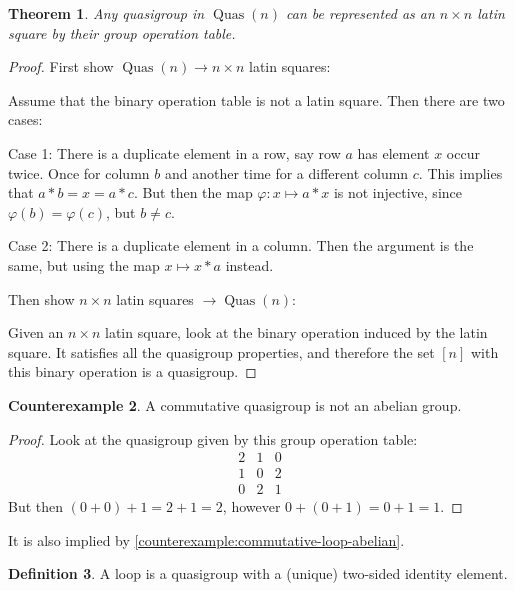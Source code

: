 \documentclass[a4paper, 12pt, english]{article}
\theoremstyle{plain}
\newtheorem{theorem}{Theorem}[section]
\theoremstyle{definition}
\newtheorem{definition}[theorem]{Definition}
\newtheorem{counterexample}[theorem]{Counterexample}
\DeclareMathOperator{\Quas}{Quas}
\begin{document}
\begin{theorem} \label{thm:latin-square-property}
    Any quasigroup in \( \Quas(n) \) can be represented as an \( n \times n \) latin square by their group operation table.
\end{theorem}
\begin{proof}
    First show \( \Quas(n) \to n \times n \) latin squares:

    Assume that the binary operation table is not a latin square. Then there are two cases:

    Case 1: There is a duplicate element in a row, say row \( a \) has element \( x \) occur twice. Once for column \( b \) and another time for a different column \( c \). This implies that \( a * b = x = a * c \). But then the map \( \varphi: x \mapsto a * x \) is not injective, since \( \varphi(b) = \varphi(c) \), but \( b \neq c \).

    Case 2: There is a duplicate element in a column. Then the argument is the same, but using the map \( x \mapsto x * a \) instead.

    Then show \( n \times n \) latin squares \( \to \Quas(n) \):

    Given an \( n \times n \) latin square, look at the binary operation induced by the latin square. It satisfies all the quasigroup properties, and therefore the set \( [n] \) with this binary operation is a quasigroup.
\end{proof}

\begin{counterexample}
    A commutative quasigroup is not an abelian group.
\end{counterexample}
\begin{proof}
    Look at the quasigroup given by this group operation table:
    \[
        \begin{matrix}
            2 & 1 & 0 \\
            1 & 0 & 2 \\
            0 & 2 & 1
        \end{matrix}
    \]
    But then \( (0 + 0) + 1 = 2 + 1 = 2 \), however \( 0 + (0 + 1) = 0 + 1 = 1 \).
\end{proof}
It is also implied by \autoref{counterexample:commutative-loop-abelian}.

\begin{definition}
    A loop is a quasigroup with a (unique) two-sided identity element.
\end{definition}
\end{document}
